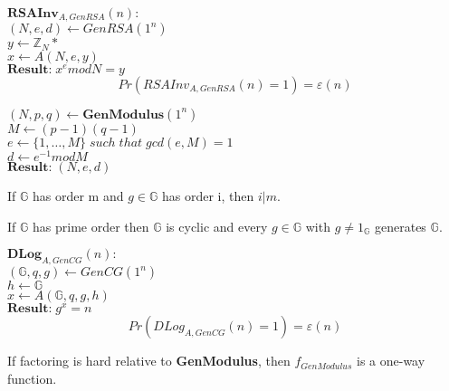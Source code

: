 \documentclass[../main]{subfiles}
\begin{document}
\noindent
$\textbf{RSAInv}_{A, GenRSA}(n):$\\
$(N, e, d) \leftarrow{} GenRSA(1^n)$\\
$y \leftarrow{} \mathbb{Z}_N*$\\
$x \leftarrow{} A(N, e, y)$\\
$\textbf{Result:} \; x^e mod N = y$
$$Pr(RSAInv_{A, GenRSA}(n) = 1) = \varepsilon{} (n)$$

\noindent
$(N, p, q) \leftarrow{} \textbf{GenModulus}(1^n)$\\
$M \leftarrow{} (p-1)(q-1)$\\
$e \leftarrow{} \{1, \ldots, M\} \; such \; that \; gcd(e, M) = 1$\\
$d \leftarrow{} e^{-1} mod M$\\
$\textbf{Result:} \; (N, e, d)$

\begin{lemma}
	If $\mathbb{G}$ has order m and $g \in{} \mathbb{G}$ has order i, then $i|m$.
\end{lemma}

\begin{theorem}
	If $\mathbb{G}$ has prime order then $\mathbb{G}$ is cyclic and every $g \in{} \mathbb{G}$ with $g \neq{} 1_{\mathbb{G}}$ generates $\mathbb{G}.$
\end{theorem}

\noindent
$\textbf{DLog}_{A, GenCG} (n):$\\
$(\mathbb{G}, q, g) \leftarrow{} GenCG(1^n)$\\
$h \leftarrow{} \mathbb{G}$\\
$x \leftarrow{} A(\mathbb{G}, q, g, h)$\\
$\textbf{Result:} \; g^x  =    n $
$$Pr(DLog_{A, GenCG} (n) = 1) = \varepsilon{} (n)$$


\begin{theorem}
	If factoring is hard relative to \textbf{GenModulus}, then $f_{GenModulus}$ is a one-way function.
\end{theorem}
\end{document}
